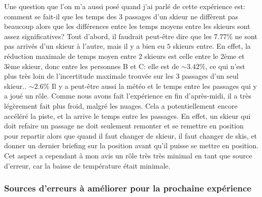 \documentclass{article}
\begin{document}
Une question que l'on m'a aussi posé quand j'ai parlé de cette expérience est: comment se fait-il que les temps des 3 passages d'un skieur ne diffèrent pas beaucoup alors que les différences entre les temps moyens entre les skieurs sont assez significatives?
\newline Tout d'abord, il faudrait peut-être dire que les $7.77\%$ ne sont pas arrivés d'un skieur à l'autre, mais il y a bien eu $5$ skieurs entre. En effet, la réduction maximale de temps moyen entre 2 skieurs est celle entre le 2ème et 3ème skieur, donc entre les personnes B et C: elle est de $\sim 3.42\%$, ce qui n'est plus très loin de l'incertitude maximale trouvée sur les 3 passages d'un seul skieur.. $\sim 2.6\%$ 
\newline Il y a peut-être aussi la météo et le temps entre les passages qui y a joué un rôle. Comme nous avons fait l'expérience en fin d'après-midi, il a très légèrement fait plus froid, malgré les nuages. Cela a potentiellement encore accéléré la piste, et la arrive le temps entre les passages. En effet, un skieur qui doit refaire un passage ne doit seulement remonter et se remettre en position pour repartir alors que quand il faut changer de skieur, il faut changer de skis, et donner un dernier briefing sur la position avant qu'il puisse se mettre en position. Cet aspect a cependant à mon avis un rôle très très minimal en tant que source d'erreur, car la baisse de température était minimale.

\subsubsection{Sources d'erreurs à améliorer pour la prochaine expérience}
\end{document}
